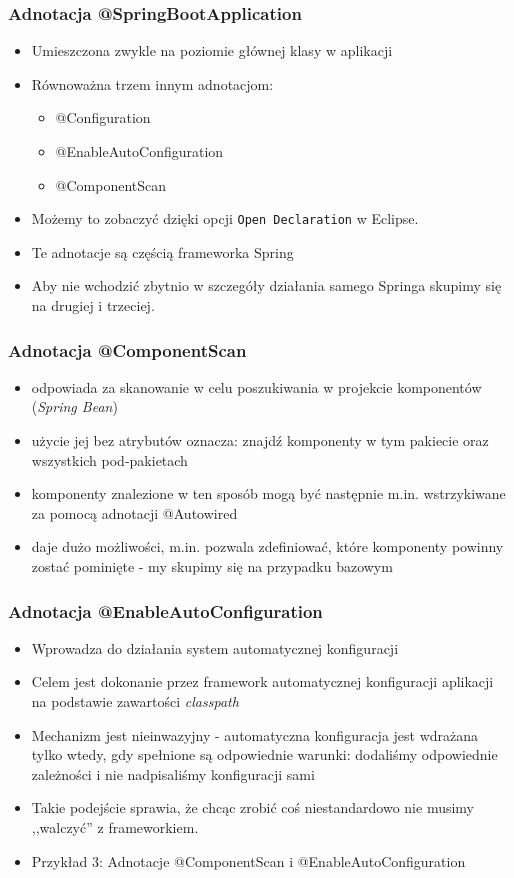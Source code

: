 \documentclass{beamer}
\begin{document}
\begin{frame}
\frametitle{Adnotacja @SpringBootApplication}
\begin{itemize}
\item Umieszczona zwykle na poziomie głównej klasy w aplikacji 
\item Równoważna trzem innym adnotacjom:
\begin{itemize}
    \item @Configuration
    \item @EnableAutoConfiguration
    \item @ComponentScan
\end{itemize}
\item Możemy to zobaczyć dzięki opcji \lstinline{Open Declaration} w Eclipse.
\item Te adnotacje są częścią frameworka Spring
\item Aby nie wchodzić zbytnio w szczegóły działania samego Springa skupimy się na drugiej i trzeciej.
\end{itemize}
\end{frame}

\begin{frame}
\frametitle{Adnotacja @ComponentScan}
\begin{itemize}
\item odpowiada za skanowanie w celu poszukiwania w projekcie komponentów (\textit{Spring Bean})
\item użycie jej bez atrybutów oznacza: znajdź komponenty w tym pakiecie oraz wszystkich pod-pakietach
\item komponenty znalezione w ten sposób mogą być następnie m.in. wstrzykiwane za pomocą adnotacji @Autowired
\item daje dużo możliwości, m.in. pozwala zdefiniować, które komponenty powinny zostać pominięte - my skupimy się na przypadku bazowym
\end{itemize}
\end{frame}

\begin{frame}
\frametitle{Adnotacja @EnableAutoConfiguration}
\begin{itemize}
\item Wprowadza do działania system automatycznej konfiguracji
\item Celem jest dokonanie przez framework automatycznej konfiguracji aplikacji na podstawie zawartości \textit{classpath}
\item Mechanizm jest nieinwazyjny - automatyczna konfiguracja jest wdrażana tylko wtedy, gdy spełnione są odpowiednie warunki: dodaliśmy odpowiednie zależności i nie nadpisaliśmy konfiguracji sami
\item Takie podejście sprawia, że chcąc zrobić coś niestandardowo nie musimy ,,walczyć'' z frameworkiem.
\item Przykład 3: Adnotacje @ComponentScan i @EnableAutoConfiguration
\end{itemize}
\end{frame}
\end{document}
